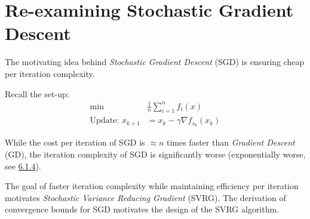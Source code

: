 \documentclass[12pt]{report}
\begin{document}

\maketitle





\section{Re-examining Stochastic Gradient Descent}

The motivating idea behind \textit{Stochastic Gradient Descent} (SGD) is ensuring cheap per iteration complexity. 

Recall the set-up:
\begin{align*} \min \;& \frac{1}{n} \sum_{i=1}^n f_i(x) \\
\text{Update:  } x_{k+1} &= x_k - \gamma \nabla f_{s_k}(x_k) 
\end{align*}

While the cost per iteration of SGD is $\approx n$ times faster than \textit{Gradient Descent} (GD), the iteration complexity of SGD is significantly worse (exponentially worse, see \href{http://papail.io/teaching/901/lecture06_scribe.pdf}{6.1.4}).

The goal of faster iteration complexity while maintaining efficiency per iteration motivates \textit{Stochastic Variance Reducing Gradient} (SVRG). The derivation of convergence bounds for SGD motivates the design of the SVRG algorithm.



%
\end{document}
